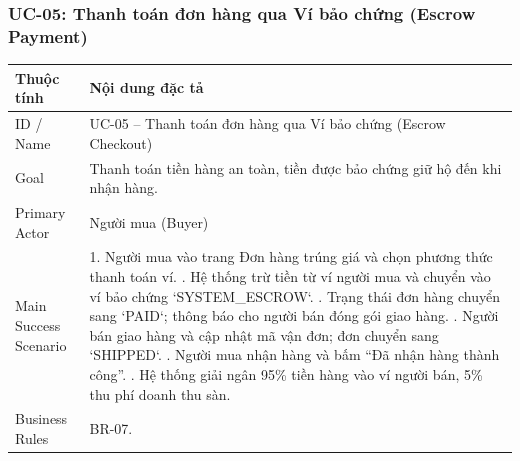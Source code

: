 \documentclass[11pt,a4paper]{article}
\begin{document}
\subsubsection{UC-05: Thanh toán đơn hàng qua Ví bảo chứng (Escrow Payment)}
\begin{table}[H]
    \centering
    \small
    \begin{tabularx}{\textwidth}{|l|X|}
        \hline
        \textbf{Thuộc tính} & \textbf{Nội dung đặc tả} \\ \hline
        ID / Name & UC-05 -- Thanh toán đơn hàng qua Ví bảo chứng (Escrow Checkout) \\ \hline
        Goal & Thanh toán tiền hàng an toàn, tiền được bảo chứng giữ hộ đến khi nhận hàng. \\ \hline
        Primary Actor & Người mua (Buyer) \\ \hline
        Main Success Scenario & 
        1. Người mua vào trang Đơn hàng trúng giá và chọn phương thức thanh toán ví. \newline
        2. Hệ thống trừ tiền từ ví người mua và chuyển vào ví bảo chứng `SYSTEM_ESCROW`. \newline
        3. Trạng thái đơn hàng chuyển sang `PAID`; thông báo cho người bán đóng gói giao hàng. \newline
        4. Người bán giao hàng và cập nhật mã vận đơn; đơn chuyển sang `SHIPPED`. \newline
        5. Người mua nhận hàng và bấm ``Đã nhận hàng thành công''. \newline
        6. Hệ thống giải ngân 95\% tiền hàng vào ví người bán, 5\% thu phí doanh thu sàn. \\ \hline
        Business Rules & BR-07. \\ \hline
    \end{tabularx}
\end{table}
\end{document}
